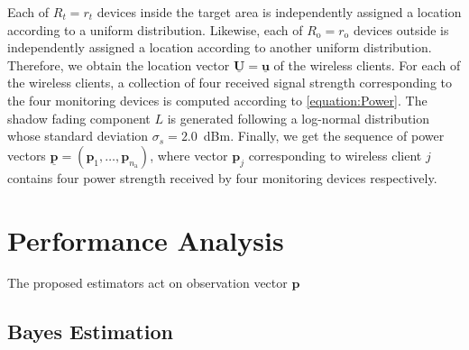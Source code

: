 Each of $R_{{t}} = r_{{t}}$ devices inside the target area is independently assigned a location according to a uniform distribution.
Likewise, each of $R_{\mathrm{o}} = r_{\mathrm{o}}$ devices outside is independently assigned a location according to another uniform distribution.
Therefore, we obtain the location vector $\underline{\mathbf{U}} = \underline{\mathbf{u}}$ of the wireless clients.
For each of the wireless clients, a collection of four received signal strength corresponding to the four monitoring devices is computed according to \eqref{equation:Power}.
The shadow fading component $L$ is generated following a log-normal distribution whose standard deviation $\sigma_{s}=2.0$~dBm.
Finally, we get the sequence of power vectors $\underline{\mathbf{p}} = (\mathbf{p}_1, \ldots, \mathbf{p}_{n_{\mathrm{a}}})$, where vector $\mathbf{p}_j$ corresponding to wireless client $j$ contains four power strength received by four monitoring devices respectively.


\section{Performance Analysis}

The proposed estimators act on observation vector $\mathbf{p}$


\subsection{Bayes Estimation}

